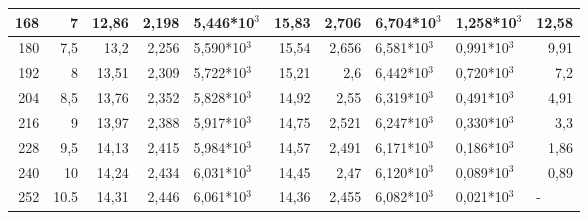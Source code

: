 \begin{table}[H]
{\begin{tabular}{|rr|rrl|rrl|l|r|}
\multicolumn{1}{|r|}{168} &
  7 &
  \multicolumn{1}{r|}{12,86} &
  \multicolumn{1}{r|}{2,198} &
  5,446*10$^3$ &
  \multicolumn{1}{r|}{15,83} &
  \multicolumn{1}{r|}{2,706} &
  6,704*10$^3$ &
  1,258*10$^3$ &
  12,58 \\ \hline
\multicolumn{1}{|r|}{180} &
  7,5 &
  \multicolumn{1}{r|}{13,2} &
  \multicolumn{1}{r|}{2,256} &
  5,590*10$^3$ &
  \multicolumn{1}{r|}{15,54} &
  \multicolumn{1}{r|}{2,656} &
  6,581*10$^3$ &
  0,991*10$^3$ &
  9,91 \\ \hline
\multicolumn{1}{|r|}{192} &
  8 &
  \multicolumn{1}{r|}{13,51} &
  \multicolumn{1}{r|}{2,309} &
  5,722*10$^3$ &
  \multicolumn{1}{r|}{15,21} &
  \multicolumn{1}{r|}{2,6} &
  6,442*10$^3$ &
  0,720*10$^3$ &
  7,2 \\ \hline
\multicolumn{1}{|r|}{204} &
  8,5 &
  \multicolumn{1}{r|}{13,76} &
  \multicolumn{1}{r|}{2,352} &
  5,828*10$^3$ &
  \multicolumn{1}{r|}{14,92} &
  \multicolumn{1}{r|}{2,55} &
  6,319*10$^3$ &
  0,491*10$^3$ &
  4,91 \\ \hline
\multicolumn{1}{|r|}{216} &
  9 &
  \multicolumn{1}{r|}{13,97} &
  \multicolumn{1}{r|}{2,388} &
  5,917*10$^3$ &
  \multicolumn{1}{r|}{14,75} &
  \multicolumn{1}{r|}{2,521} &
  6,247*10$^3$ &
  0,330*10$^3$ &
  3,3 \\ \hline
\multicolumn{1}{|r|}{228} &
  9,5 &
  \multicolumn{1}{r|}{14,13} &
  \multicolumn{1}{r|}{2,415} &
  5,984*10$^3$ &
  \multicolumn{1}{r|}{14,57} &
  \multicolumn{1}{r|}{2,491} &
  6,171*10$^3$ &
  0,186*10$^3$ &
  1,86 \\ \hline
\multicolumn{1}{|r|}{240} &
  10 &
  \multicolumn{1}{r|}{14,24} &
  \multicolumn{1}{r|}{2,434} &
  6,031*10$^3$ &
  \multicolumn{1}{r|}{14,45} &
  \multicolumn{1}{r|}{2,47} &
  6,120*10$^3$ &
  0,089*10$^3$ &
  0,89 \\ \hline
\multicolumn{1}{|r|}{252} &
  10.5 &
  \multicolumn{1}{r|}{14,31} &
  \multicolumn{1}{r|}{2,446} &
  6,061*10$^3$ &
  \multicolumn{1}{r|}{14,36} &
  \multicolumn{1}{r|}{2,455} &
  6,082*10$^3$ &
  0,021*10$^3$ &
  \multicolumn{1}{l|}{-} \\ \hline
\end{tabular}%
}
\end{table}

